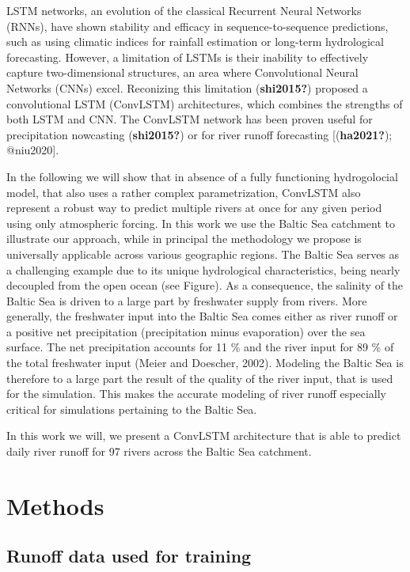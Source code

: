 \documentclass[
]{agujournal2019}
\begin{document}
LSTM networks, an evolution of the classical Recurrent Neural Networks
(RNNs), have shown stability and efficacy in sequence-to-sequence
predictions, such as using climatic indices for rainfall estimation or
long-term hydrological forecasting. However, a limitation of LSTMs is
their inability to effectively capture two-dimensional structures, an
area where Convolutional Neural Networks (CNNs) excel. Reconizing this
limitation (\textbf{shi2015?}) proposed a convolutional LSTM (ConvLSTM)
architectures, which combines the strengths of both LSTM and CNN. The
ConvLSTM network has been proven useful for precipitation nowcasting
(\textbf{shi2015?}) or for river runoff forecasting
{[}(\textbf{ha2021?}); @niu2020{]}.

In the following we will show that in absence of a fully functioning
hydrogolocial model, that also uses a rather complex parametrization,
ConvLSTM also represent a robust way to predict multiple rivers at once
for any given period using only atmospheric forcing. In this work we use
the Baltic Sea catchment to illustrate our approach, while in principal
the methodology we propose is universally applicable across various
geographic regions. The Baltic Sea serves as a challenging example due
to its unique hydrological characteristics, being nearly decoupled from
the open ocean (see Figure). As a consequence, the salinity of the
Baltic Sea is driven to a large part by freshwater supply from rivers.
More generally, the freshwater input into the Baltic Sea comes either as
river runoff or a positive net precipitation (precipitation minus
evaporation) over the sea surface. The net precipitation accounts for 11
\% and the river input for 89 \% of the total freshwater input (Meier
and Doescher, 2002). Modeling the Baltic Sea is therefore to a large
part the result of the quality of the river input, that is used for the
simulation. This makes the accurate modeling of river runoff especially
critical for simulations pertaining to the Baltic Sea.

In this work we will, we present a ConvLSTM architecture that is able to
predict daily river runoff for 97 rivers across the Baltic Sea
catchment.

\hypertarget{methods}{%
\section{Methods}\label{methods}}

\hypertarget{runoff-data-used-for-training}{%
\subsection{Runoff data used for
training}\label{runoff-data-used-for-training}}
\end{document}

